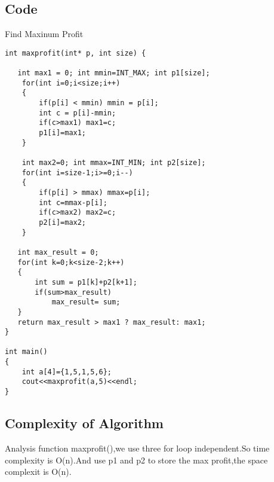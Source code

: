 \documentclass[]{article}
\begin{document}
\subsection{Code}
\begin{algorithm}[H]
\caption{Find Maxinum Profit}
\begin{lstlisting}
int maxprofit(int* p, int size) {

   int max1 = 0; int mmin=INT_MAX; int p1[size];
	for(int i=0;i<size;i++)
	{
		if(p[i] < mmin) mmin = p[i];
		int c = p[i]-mmin;
		if(c>max1) max1=c;
		p1[i]=max1;
	}

	int max2=0;	int mmax=INT_MIN; int p2[size];
	for(int i=size-1;i>=0;i--)
	{
		if(p[i] > mmax) mmax=p[i];
		int c=mmax-p[i];
		if(c>max2) max2=c;
		p2[i]=max2;
	}

   int max_result = 0;
   for(int k=0;k<size-2;k++)
   {
	   int sum = p1[k]+p2[k+1];
	   if(sum>max_result)
		   max_result= sum;
   }
   return max_result > max1 ? max_result: max1;
}

int main()
{
	int a[4]={1,5,1,5,6};
	cout<<maxprofit(a,5)<<endl;
}

\end{lstlisting}
\end{algorithm}
\subsection{Complexity of Algorithm}
Analysis function maxprofit(),we use three for loop independent.So time complexity is O(n).And use p1 and p2 to store the max profit,the space complexit is O(n).
\end{document}
